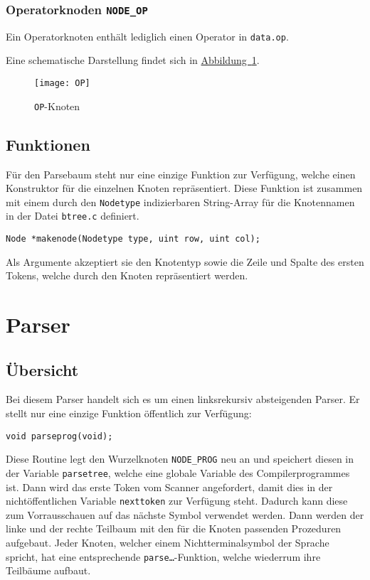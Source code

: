 \subsubsection{Operatorknoden \texttt{NODE\_OP}}
\label{sec:opnode}
Ein Operatorknoten enthält lediglich einen Operator in \texttt{data.op}.

Eine schematische Darstellung findet sich in \hyperref[fig:opnode]{Abbildung~\ref{fig:opnode}}.

\begin{figure}[h!]
\centering
\texttt{[image: OP]}
\caption{\texttt{OP}-Knoten}
\label{fig:opnode}
\end{figure}

\subsection{Funktionen}

Für den Parsebaum steht nur eine einzige Funktion zur Verfügung,
welche einen Konstruktor für die einzelnen Knoten repräsentiert.
Diese Funktion ist zusammen mit einem durch den \texttt{Nodetype} indizierbaren String-Array für die Knotennamen in der Datei \texttt{btree.c} definiert.

\begin{lstlisting}
Node *makenode(Nodetype type, uint row, uint col);
\end{lstlisting}

Als Argumente akzeptiert sie den Knotentyp sowie die Zeile und Spalte des ersten Tokens,
welche durch den Knoten repräsentiert werden.

\clearpage

\section{Parser}

\subsection{Übersicht}
Bei diesem Parser handelt sich es um einen linksrekursiv absteigenden Parser.
Er stellt nur eine einzige Funktion öffentlich zur Verfügung:

\begin{lstlisting}
void parseprog(void);
\end{lstlisting}

Diese Routine legt den Wurzelknoten \texttt{NODE\_PROG} neu an und speichert diesen in der Variable \texttt{parsetree},
welche eine globale Variable des Compilerprogrammes ist.
Dann wird das erste Token vom Scanner angefordert,
damit dies in der nichtöffentlichen Variable \texttt{nexttoken} zur Verfügung steht.
Dadurch kann diese zum Vorrausschauen auf das nächste Symbol verwendet werden.
Dann werden der linke und der rechte Teilbaum mit den für die Knoten passenden Prozeduren aufgebaut.
Jeder Knoten, welcher einem Nichtterminalsymbol der Sprache spricht,
hat eine entsprechende \texttt{parse\ldots}-Funktion,
welche wiederrum ihre Teilbäume aufbaut.

